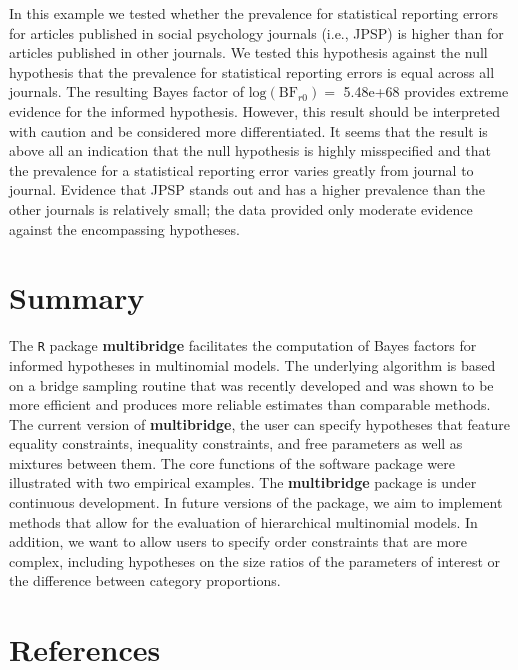 \documentclass[
  english,
  man,floatsintext]{apa6}
\begin{document}
In this example we tested whether the prevalence for statistical reporting errors for articles published in social psychology journals (i.e., JPSP) is higher than for articles published in other journals. We tested this hypothesis against the null hypothesis that the prevalence for statistical reporting errors is equal across all journals. The resulting Bayes factor of \(\text{log}(\text{BF}_{r0}) =\) 5.48e+68 provides extreme evidence for the informed hypothesis. However, this result should be interpreted with caution and be considered more differentiated. It seems that the result is above all an indication that the null hypothesis is highly misspecified and that the prevalence for a statistical reporting error varies greatly from journal to journal. Evidence that JPSP stands out and has a higher prevalence than the other journals is relatively small; the data provided only moderate evidence against the encompassing hypotheses.

\hypertarget{summary}{%
\section{Summary}\label{summary}}

The \texttt{R} package \textbf{multibridge} facilitates the computation of Bayes factors for informed hypotheses in multinomial models. The underlying algorithm is based on a bridge sampling routine that was recently developed and was shown to be more efficient and produces more reliable estimates than comparable methods. The current version of \textbf{multibridge}, the user can specify hypotheses that feature equality constraints, inequality constraints, and free parameters as well as mixtures between them. The core functions of the software package were illustrated with two empirical examples. The \textbf{multibridge} package is under continuous development. In future versions of the package, we aim to implement methods that allow for the evaluation of hierarchical multinomial models. In addition, we want to allow users to specify order constraints that are more complex, including hypotheses on the size ratios of the parameters of interest or the difference between category proportions.

\hypertarget{references}{%
\section{References}\label{references}}

\begingroup
\setlength{\parindent}{-0.5in}
\setlength{\leftskip}{0.5in}
\end{document}
